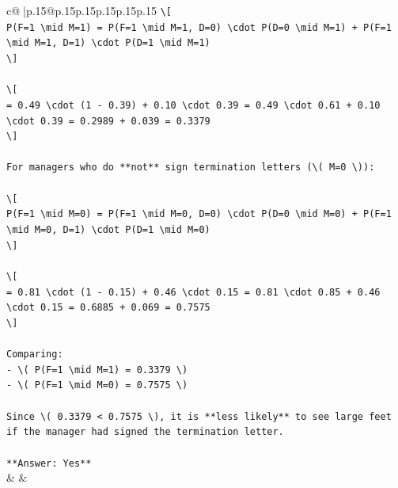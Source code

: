 \documentclass{article}
\begin{document}
{\begin{supertabular}{c@{$\;$}|p{.15\linewidth}@{}p{.15\linewidth}p{.15\linewidth}p{.15\linewidth}p{.15\linewidth}p{.15\linewidth}}
{{{\texttt{\textbackslash{}{[}} \\
\texttt{P(F=1 \textbackslash{}mid M=1) = P(F=1 \textbackslash{}mid M=1, D=0) \textbackslash{}cdot P(D=0 \textbackslash{}mid M=1) + P(F=1 \textbackslash{}mid M=1, D=1) \textbackslash{}cdot P(D=1 \textbackslash{}mid M=1)} \\
\texttt{\textbackslash{}{]}} \\
\\ 
\texttt{\textbackslash{}{[}} \\
\texttt{= 0.49 \textbackslash{}cdot (1 {-} 0.39) + 0.10 \textbackslash{}cdot 0.39 = 0.49 \textbackslash{}cdot 0.61 + 0.10 \textbackslash{}cdot 0.39 = 0.2989 + 0.039 = 0.3379} \\
\texttt{\textbackslash{}{]}} \\
\\ 
\texttt{For managers who do **not** sign termination letters (\textbackslash{}( M=0 \textbackslash{})):} \\
\\ 
\texttt{\textbackslash{}{[}} \\
\texttt{P(F=1 \textbackslash{}mid M=0) = P(F=1 \textbackslash{}mid M=0, D=0) \textbackslash{}cdot P(D=0 \textbackslash{}mid M=0) + P(F=1 \textbackslash{}mid M=0, D=1) \textbackslash{}cdot P(D=1 \textbackslash{}mid M=0)} \\
\texttt{\textbackslash{}{]}} \\
\\ 
\texttt{\textbackslash{}{[}} \\
\texttt{= 0.81 \textbackslash{}cdot (1 {-} 0.15) + 0.46 \textbackslash{}cdot 0.15 = 0.81 \textbackslash{}cdot 0.85 + 0.46 \textbackslash{}cdot 0.15 = 0.6885 + 0.069 = 0.7575} \\
\texttt{\textbackslash{}{]}} \\
\\ 
\texttt{Comparing:} \\
\texttt{{-} \textbackslash{}( P(F=1 \textbackslash{}mid M=1) = 0.3379 \textbackslash{})} \\
\texttt{{-} \textbackslash{}( P(F=1 \textbackslash{}mid M=0) = 0.7575 \textbackslash{})} \\
\\ 
\texttt{Since \textbackslash{}( 0.3379 < 0.7575 \textbackslash{}), it is **less likely** to see large feet if the manager had signed the termination letter.} \\
\\ 
\texttt{**Answer: Yes**} \\
            }
        }
    }
    & & \\ \\


\end{supertabular}}
\end{document}
